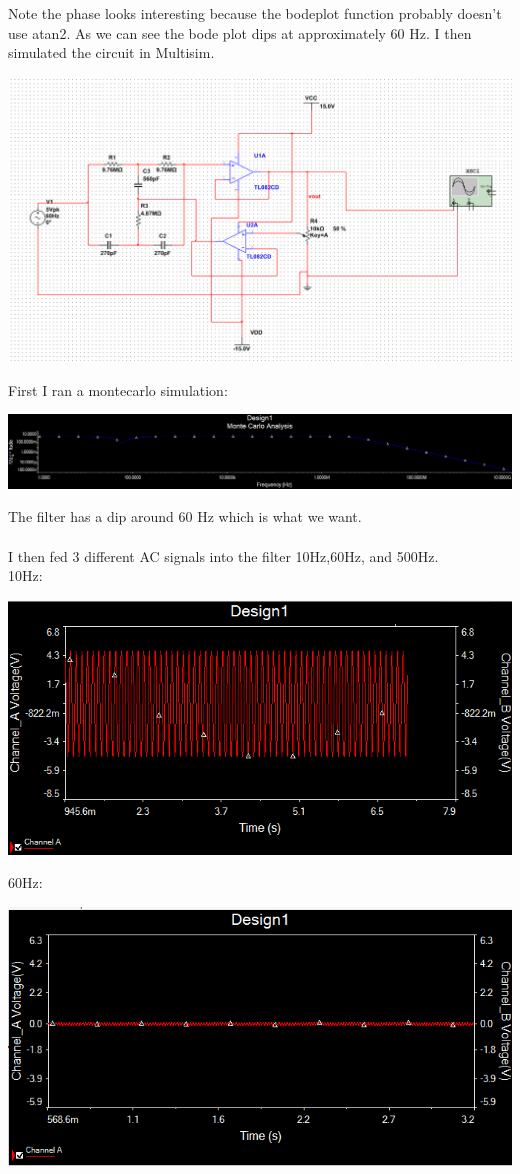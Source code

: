 \documentclass[12pt,letterpaper,boxed]{hmcpset}
\begin{document}
Note the phase looks interesting because the bodeplot function probably doesn't use atan2. As we can see the bode plot dips at approximately 60 Hz. I then simulated the circuit in Multisim.\begin{center}
\includegraphics[scale=.5]{Circuit}
\end{center}
First I ran a montecarlo simulation:
\begin{center}
\includegraphics[scale=1]{montecarlo}
\end{center}
The filter has a dip around 60 Hz which is what we want.\\\\
I then fed 3 different AC signals into the filter 10Hz,60Hz, and 500Hz.\\
10Hz:
\begin{center}
\includegraphics[scale=1]{10Hz}
\end{center}
60Hz:
\begin{center}
\includegraphics[scale=1]{60Hzsim}
\end{center}
\end{document}
